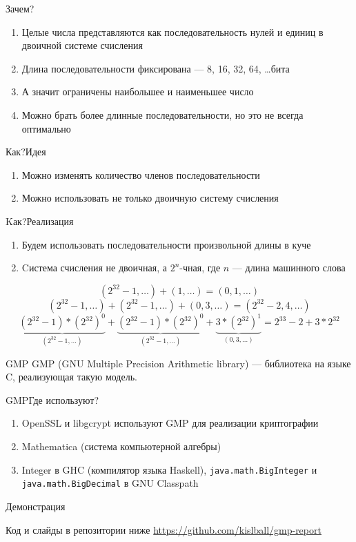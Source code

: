 \begin{frame}{Зачем?}
  \begin{enumerate}
    \item Целые числа представляются как последовательность нулей и единиц
      в двоичной системе счисления
    \item Длина последовательности фиксирована --- 8, 16, 32, 64, \ldots бита
    \item А значит ограничены наибольшее и наименьшее число \pause
    \item Можно брать более длинные последовательности, но это не
      всегда оптимально
  \end{enumerate}
\end{frame}

\begin{frame}{Как?}{Идея}
  \begin{enumerate}
    \item Можно изменять количество членов последовательности
    \item Можно использовать не только двоичную систему счисления
  \end{enumerate}
\end{frame}

\begin{frame}{Kак?}{Реализация}
  \begin{enumerate}
    \item Будем использовать последовательности произвольной длины в куче
    \item Cистема счисления не двоичная, а $2^n$-чная, где $n$ ---
      длина машинного слова
  \end{enumerate}

  $$(2^{32}-1,\ldots)+(1,\ldots)=(0,1,\ldots)$$\pause
  $$(2^{32}-1,\ldots)+(2^{32}-1,\ldots)+(0,3,\ldots)=(2^{32} - 2,4,\ldots)$$
  $$\underbrace{(2^{32} - 1)*(2^{32})^0}_{(2^{32}-1,\ldots)} +
  \underbrace{(2^{32} - 1)*(2^{32})^0}_{(2^{32}-1,\ldots)} +
  \underbrace{3*(2^{32})^1}_{(0,3,\ldots)}
  = 2^{33} - 2 + 3*2^{32}$$
\end{frame}

\begin{frame}{GMP}
  GMP (GNU Multiple Precision Arithmetic library) --- библиотека на
  языке C, реализующая такую модель.
  
\end{frame}

\begin{frame}{GMP}{Где используют?}
  \begin{enumerate}
    \item OpenSSL и libgcrypt используют GMP для реализации криптографии
    \item Mathematica (система компьютерной алгебры)
    \item Integer в GHC (компилятор языка Haskell),
      \texttt{java.math.BigInteger} и \texttt{java.math.BigDecimal} в
      GNU Classpath
  \end{enumerate}
\end{frame}

\begin{frame}
  \begin{center}
    { \Huge Демонстрация}
  \end{center}
  \vspace{0.5cm}
  \begin{center}
    {\large Код и слайды в репозитории ниже}
    {\large \url{https://github.com/kislball/gmp-report}}
  \end{center}
\end{frame}
